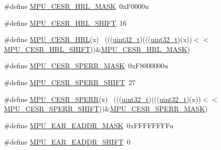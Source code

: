 \begin{DoxyCompactItemize}
\item 
\#define \hyperlink{group___m_p_u___register___masks_gac91de83bf386f4896d634b4283e3ac12}{M\+P\+U\+\_\+\+C\+E\+S\+R\+\_\+\+H\+R\+L\+\_\+\+M\+A\+SK}~0x\+F0000u
\item 
\#define \hyperlink{group___m_p_u___register___masks_ga9e19f94c8fa7c703ae194f8df2920795}{M\+P\+U\+\_\+\+C\+E\+S\+R\+\_\+\+H\+R\+L\+\_\+\+S\+H\+I\+FT}~16
\item 
\#define \hyperlink{group___m_p_u___register___masks_ga766ed7d8ee03f0a9ede81c0f88604bff}{M\+P\+U\+\_\+\+C\+E\+S\+R\+\_\+\+H\+RL}(x)                                                ~(((\hyperlink{_p_e___types_8h_a33594304e786b158f3fb30289278f5af}{uint32\+\_\+t})(((\hyperlink{_p_e___types_8h_a33594304e786b158f3fb30289278f5af}{uint32\+\_\+t})(x))$<$$<$\hyperlink{group___m_p_u___register___masks_ga9e19f94c8fa7c703ae194f8df2920795}{M\+P\+U\+\_\+\+C\+E\+S\+R\+\_\+\+H\+R\+L\+\_\+\+S\+H\+I\+FT}))\&\hyperlink{group___m_p_u___register___masks_gac91de83bf386f4896d634b4283e3ac12}{M\+P\+U\+\_\+\+C\+E\+S\+R\+\_\+\+H\+R\+L\+\_\+\+M\+A\+SK})
\item 
\#define \hyperlink{group___m_p_u___register___masks_ga92110b62cfcd6178c2b26e7aaef222b1}{M\+P\+U\+\_\+\+C\+E\+S\+R\+\_\+\+S\+P\+E\+R\+R\+\_\+\+M\+A\+SK}~0x\+F8000000u
\item 
\#define \hyperlink{group___m_p_u___register___masks_ga69779e128c116e87116f7aa67b9a8dcc}{M\+P\+U\+\_\+\+C\+E\+S\+R\+\_\+\+S\+P\+E\+R\+R\+\_\+\+S\+H\+I\+FT}~27
\item 
\#define \hyperlink{group___m_p_u___register___masks_ga75132936153b01c17b2909bc8a61c395}{M\+P\+U\+\_\+\+C\+E\+S\+R\+\_\+\+S\+P\+E\+RR}(x)                                            ~(((\hyperlink{_p_e___types_8h_a33594304e786b158f3fb30289278f5af}{uint32\+\_\+t})(((\hyperlink{_p_e___types_8h_a33594304e786b158f3fb30289278f5af}{uint32\+\_\+t})(x))$<$$<$\hyperlink{group___m_p_u___register___masks_ga69779e128c116e87116f7aa67b9a8dcc}{M\+P\+U\+\_\+\+C\+E\+S\+R\+\_\+\+S\+P\+E\+R\+R\+\_\+\+S\+H\+I\+FT}))\&\hyperlink{group___m_p_u___register___masks_ga92110b62cfcd6178c2b26e7aaef222b1}{M\+P\+U\+\_\+\+C\+E\+S\+R\+\_\+\+S\+P\+E\+R\+R\+\_\+\+M\+A\+SK})
\item 
\#define \hyperlink{group___m_p_u___register___masks_ga2fec46c3866c88337f8ee0639c8d81b5}{M\+P\+U\+\_\+\+E\+A\+R\+\_\+\+E\+A\+D\+D\+R\+\_\+\+M\+A\+SK}~0x\+F\+F\+F\+F\+F\+F\+F\+Fu
\item 
\#define \hyperlink{group___m_p_u___register___masks_ga2bbd867e08b8ad2b609ab33a558e501c}{M\+P\+U\+\_\+\+E\+A\+R\+\_\+\+E\+A\+D\+D\+R\+\_\+\+S\+H\+I\+FT}~0

\end{DoxyCompactItemize}
